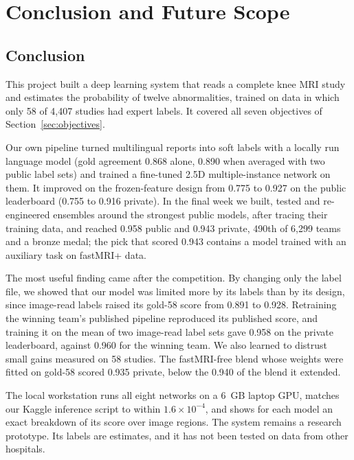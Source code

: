 \chapter[CONCLUSION AND FUTURE SCOPE]{Conclusion and Future Scope}
\label{ch:conclusion}

\section{Conclusion}

This project built a deep learning system that reads a complete knee MRI study and estimates the probability of twelve abnormalities, trained on data in which only 58 of 4,407 studies had expert labels. It covered all seven objectives of Section~\ref{sec:objectives}.

Our own pipeline turned multilingual reports into soft labels with a locally run language model (gold agreement 0.868 alone, 0.890 when averaged with two public label sets) and trained a fine-tuned 2.5D multiple-instance network on them. It improved on the frozen-feature design from 0.775 to 0.927 on the public leaderboard (0.755 to 0.916 private). In the final week we built, tested and re-engineered ensembles around the strongest public models, after tracing their training data, and reached 0.958 public and 0.943 private, 490th of 6,299 teams and a bronze medal; the pick that scored 0.943 contains a model trained with an auxiliary task on fastMRI+ data.

The most useful finding came after the competition. By changing only the label file, we showed that our model was limited more by its labels than by its design, since image-read labels raised its gold-58 score from 0.891 to 0.928. Retraining the winning team's published pipeline reproduced its published score, and training it on the mean of two image-read label sets gave 0.958 on the private leaderboard, against 0.960 for the winning team. We also learned to distrust small gains measured on 58 studies. The fastMRI-free blend whose weights were fitted on gold-58 scored 0.935 private, below the 0.940 of the blend it extended.

The local workstation runs all eight networks on a 6~GB laptop GPU, matches our Kaggle inference script to within $1.6\times10^{-4}$, and shows for each model an exact breakdown of its score over image regions. The system remains a research prototype. Its labels are estimates, and it has not been tested on data from other hospitals.

